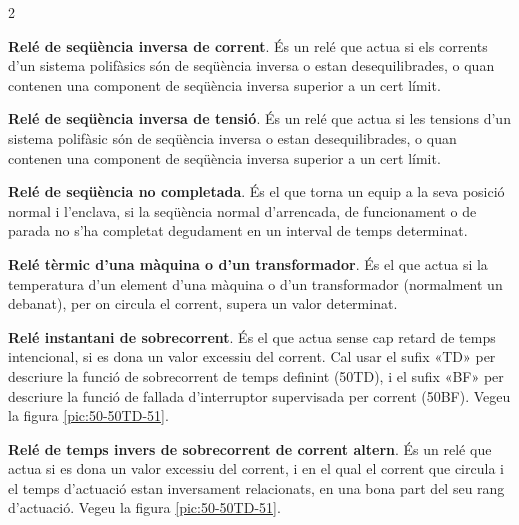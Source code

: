 \begin{multicols}{2}
\begin{list}{}
		\item[\textbf{46}]   
		\textbf{Relé de seqüència inversa de corrent}. És un relé que actua si els corrents
		d'un sistema polifàsics són de seqüència inversa o estan
		desequilibrades, o quan contenen una component de seqüència inversa
		superior a un cert límit.
		
		\item[\textbf{47}]   
		\textbf{Relé de seqüència inversa de tensió}. És un relé que actua si les tensions d'un sistema polifàsic són de seqüència inversa o estan
		desequilibrades, o quan contenen una component de seqüència inversa
		superior a un cert límit.
		
		\item[\textbf{48}]   
		\textbf{Relé de seqüència no completada}. És el que torna un equip a la seva posició normal  i
		l'enclava, si la seqüència normal d'arrencada, de funcionament o de
		parada no s'ha completat degudament en un interval de temps
		determinat.
		
		\item[\textbf{49}]  
		\textbf{Relé tèrmic d'una màquina o d'un transformador}. És el que
		actua si la temperatura d'un element d'una màquina o d'un
		transformador (normalment un debanat), per on circula el corrent,
		supera un valor determinat.
		
		\item[\textbf{50}]   
		\textbf{Relé instantani de sobrecorrent}. És el que actua sense cap retard de temps intencional, si es dona un valor excessiu del
		corrent. Cal usar el sufix «TD» per descriure la funció de sobrecorrent de temps definint (50TD), i el sufix «BF» per descriure la funció de fallada d'interruptor supervisada per corrent (50BF). Vegeu la figura \vref{pic:50-50TD-51}.
		
		\item[\textbf{51}]  
		\textbf{Relé de temps invers  de sobrecorrent de corrent altern}. És
		un relé que actua si es dona un valor excessiu del corrent, i en el qual el corrent que circula i el temps d'actuació estan inversament relacionats, en una bona part del seu rang d'actuació. Vegeu la figura \vref{pic:50-50TD-51}.
		

\end{list}
\end{multicols}
